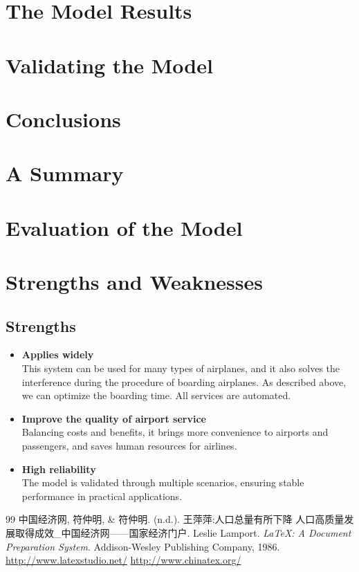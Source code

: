 \documentclass{mcmthesis}
\begin{document}
\section{The Model Results}
\lipsum[6]

\section{Validating the Model}
\lipsum[9]

\section{Conclusions}
\lipsum[6]

\section{A Summary}
\lipsum[6]

\section{Evaluation of the Model}
\lipsum[12]

\section{Strengths and Weaknesses}
\lipsum[12]

\subsection{Strengths}
\begin{itemize}
\item \textbf{Applies widely}\\
This system can be used for many types of airplanes, and it also solves the interference during the procedure of boarding airplanes. As described above, we can optimize the boarding time. All services are automated.
\item \textbf{Improve the quality of airport service}\\
Balancing costs and benefits, it brings more convenience to airports and passengers, and saves human resources for airlines.
\item \textbf{High reliability}\\
The model is validated through multiple scenarios, ensuring stable performance in practical applications.
\end{itemize}

\begin{thebibliography}{99}
 中国经济网, 符仲明, & 符仲明. (n.d.). 王萍萍:人口总量有所下降 人口高质量发展取得成效_中国经济网——国家经济门户. 
 Leslie Lamport. \textit{\LaTeX{}: A Document Preparation System}. Addison-Wesley Publishing Company, 1986.
 \url{http://www.latexstudio.net/}
 \url{http://www.chinatex.org/}
\end{thebibliography}
\end{document}
